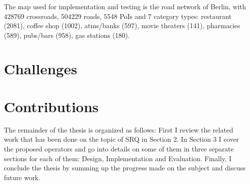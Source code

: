  
The map used for implementation and testing is the road network of Berlin, with 428769 crossroads, 504229 roads, 5548 PoIs and 7 category types: restaurant (2081), coffee shop (1002), atms/banks (597), movie theaters (141), pharmacies (589), pubs/bars (958), gas stations (180). 
\newline

\section{Challenges}

\section{Contributions}

The remainder of the thesis is organized as follows: First I review the related work that has been done on the topic of SRQ in Section 2. In Section 3 I cover the proposed operators and go into details on some of them in three separate sections for each of them: Design, Implementation and Evaluation. Finally, I conclude the thesis by summing up the progress made on the subject and discuss future work.